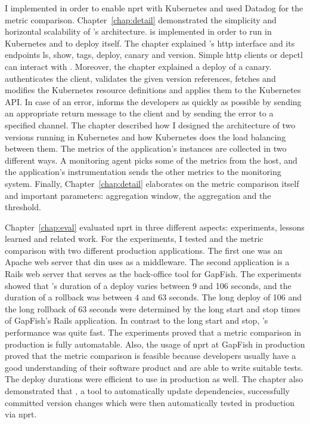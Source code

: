 I implemented \deployer{} in order to enable \gls{nprt} with Kubernetes and used Datadog for
the metric comparison. Chapter~\ref{chap:detail} demonstrated the simplicity and
horizontal scalability of \deployer{}'s architecture. \deployer{} is implemented in order to
run in Kubernetes and to deploy itself. The chapter explained \deployer{}'s \gls{http}
interface and its endpoints ls, show, tags, deploy, canary and version. Simple \gls{http}
clients or depctl can interact with \deployer{}. Moreover, the chapter explained a deploy of
a canary. \deployer{} authenticates the client, validates the given version
references, fetches and modifies the Kubernetes resource definitions and applies them to
the Kubernetes API. In case of an error, \deployer{} informs the developers as quickly as
possible by sending an appropriate return message to the client and by sending the error
to a specified channel. The chapter described how I designed the architecture of two
versions running in Kubernetes and how Kubernetes does the load balancing between
them. The metrics of the application's instances are collected in two different ways. A
monitoring agent picks some of the metrics from the host, and the application's
instrumentation sends the other metrics to the monitoring system. Finally,
Chapter~\ref{chap:detail} elaborates on the metric comparison itself and important
parameters: aggregation window, the aggregation and the threshold.

Chapter~\ref{chap:eval} evaluated \gls{nprt} in three different aspects: experiments,
lessons learned and related work. For the experiments, I tested \deployer{} and the metric
comparison with two different production applications. The first one was an Apache web
server that \gls{din} uses as a middleware. The second application is a Rails web server
that serves as the back-office tool for GapFish. The experiments showed that \deployer{}'s
duration of a deploy varies between 9 and 106 seconds, and the duration of a rollback was between
4 and 63 seconds. The long deploy of 106 and the long rollback of 63 seconds were
determined by the long start and stop times of GapFish's Rails application. In contrast to
the long start and stop, \deployer{}'s performance was quite fast. The experiments proved that a
metric comparison in production is fully automatable. Also, the usage of \gls{nprt} at
GapFish in production proved that the metric comparison is feasible because developers
usually have a good understanding of their software product and are able to write suitable
tests. The deploy durations were efficient to use \deployer{} in production as well. The
chapter also demonstrated that \gemupdater{}, a tool to automatically update dependencies,
successfully committed version changes which were then automatically tested in production
via \gls{nprt}.

